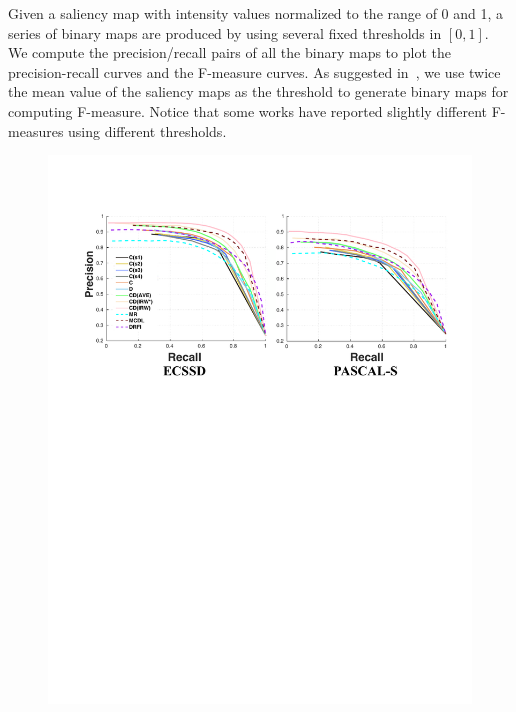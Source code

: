 \documentclass[journal]{IEEEtran}
\begin{document}
Given a saliency map with intensity values normalized to the range of 0 and 1, a series of binary maps are produced by using several fixed thresholds in $[0, 1]$. We compute the precision/recall pairs of all the binary maps to plot the precision-recall curves and the F-measure curves. As suggested in~\cite{Achanta2009Frequency}, we use twice the mean value of the saliency maps as the threshold to generate binary maps for computing F-measure. Notice that some works have reported slightly different F-measures using different thresholds.
\begin{figure}[t]
\begin{center}
\includegraphics[width=1\linewidth]{figure6.pdf}
\end{center}

\end{figure}
\end{document}
